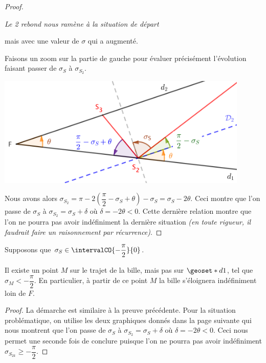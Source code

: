 \begin{proof}
\begin{center}
		\itshape\small
		Le 2\ieme{} rebond nous ramène à la situation de départ
		
		mais avec une valeur de $\sigma$ qui a augmenté.
	\end{center}
	
	
	\medskip
	
	Faisons un zoom sur la partie de gauche pour évaluer précisément l'évolution faisant passer de $\sigma_S$ à $\sigma_{S_2}$.
	
	\begin{center}
		\includegraphics[width=12cm]{basic-math-pool/proof-starting-with-d2-2-bounces-to-F-zoom.png}
	\end{center}
	
	
	\medskip
	
	Nous avons alors $\sigma_{S_2} = \pi - 2 \left( \dfrac{\pi}{2} - \sigma_S + \theta \right) - \sigma_S = \sigma_S - 2 \theta$.
	Ceci montre que l'on passe de $\sigma_S$ à $\sigma_{S_2} = \sigma_S + \delta$ où $\delta = - 2 \theta < 0$. Cette dernière relation montre que l'on ne pourra pas avoir indéfiniment la dernière situation \emph{(en toute rigueur, il faudrait faire un raisonnement par récurrence)}.  
\end{proof}


\medskip


\begin{fact} \label{s-eloigner}
	Supposons que $\sigma_S \in \intervalCO{- \dfrac{\pi}{2}}{0}$.

	\medskip
	
	Il existe un point $M$ sur le trajet de la bille, mais pas sur $\geoset*{d}{1}$, tel que $\sigma_M < - \dfrac{\pi}{2}$. En particulier, à partir de ce point $M$ la bille s'éloignera indéfiniment loin de $F$.
\end{fact}

\begin{proof}
	La démarche est similaire à la preuve précédente.
	Pour la situation problématique, on utilise les deux graphiques donnés dans la page suivante qui nous montrent que l'on passe de $\sigma_S$ à $\sigma_{S_2} = \sigma_S + \delta$ où $\delta = - 2 \theta < 0$. Ceci nous permet une seconde fois de conclure puisque l'on ne pourra pas avoir indéfiniment $\sigma_{S_{2k}} \geqslant - \dfrac{\pi}{2}$.
\end{proof}


